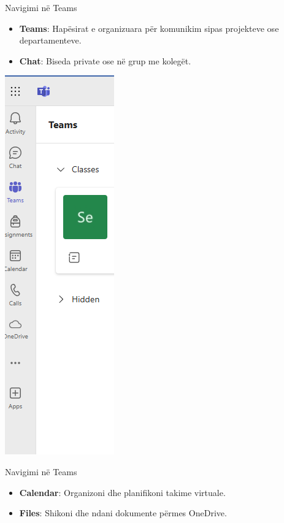 \documentclass[
  ignorenonframetext,
]{beamer}
\begin{document}
\begin{frame}{Navigimi në Teams}
\label{navigimi-nuxeb-teams}
\begin{itemize}
\item
  \textbf{Teams}: Hapësirat e organizuara për komunikim sipas projekteve
  ose departamenteve.
\item
  \textbf{Chat}: Biseda private ose në grup me kolegët.
\end{itemize}

\includegraphics{./images/teams2.png}
\end{frame}

\begin{frame}{Navigimi në Teams}
\label{navigimi-nuxeb-teams-1}
\begin{itemize}
\item
  \textbf{Calendar}: Organizoni dhe planifikoni takime virtuale.
\item
  \textbf{Files}: Shikoni dhe ndani dokumente përmes OneDrive.
\end{itemize}
\end{frame}
\end{document}

